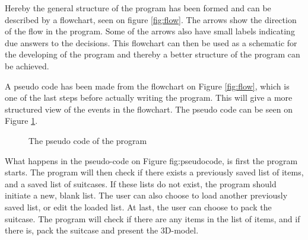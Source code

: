 
Hereby the general structure of the program has been formed and can be described by a flowchart, seen on figure \ref{fig:flow}.
The arrows show the direction of the flow in the program. Some of the arrows also have small labels indicating due answers to the decisions.
This flowchart can then be used as a schematic for the developing of the program and thereby a better structure of the program can be achieved.

A pseudo code has been made from the flowchart on Figure \ref{fig:flow}, which is one of the last steps before actually writing the program. This will give a more structured view of the events in the flowchart. The pseudo code can be seen on Figure \ref{fig:pseudocode}.

\begin{figure}[H] \centering
			
\caption{The pseudo code of the program}\label{fig:pseudocode}
\end{figure}

What happens in the pseudo-code on Figure {fig:pseudocode}, is first the program starts. The program will then check if there exists a previously saved list of items, and a saved list of suitcases. If these lists do not exist, the program should initiate a new, blank list. The user can also choose to load another previously saved list, or edit the loaded list. At last, the user can choose to pack the suitcase. The program will check if there are any items in the list of items, and if there is, pack the suitcase and present the 3D-model. 